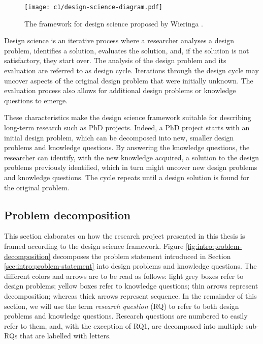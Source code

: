 \begin{figure}
    \centering
    \texttt{[image: c1/design-science-diagram.pdf]}
    \caption{The framework for design science proposed by Wieringa \cite{Wieringa2014}.}\label{fig:design-science}
\end{figure}

Design science is an iterative process where a researcher analyses a design problem, identifies a solution, evaluates the solution, and, if the solution is not satisfactory, they start over. 
The analysis of the design problem and its evaluation are referred to as design cycle.
Iterations through the design cycle may uncover aspects of the original design problem that were initially unknown.
The evaluation process also allows for additional design problems or knowledge questions to emerge.

These characteristics make the design science framework suitable for describing long-term research such as PhD projects.
Indeed, a PhD project starts with an initial design problem, which can be decomposed into new, smaller design problems and knowledge questions.
By answering the knowledge questions, the researcher can identify, with the new knowledge acquired, a solution to the design problems previously identified, which in turn might uncover new design problems and knowledge questions.
The cycle repeats until a design solution is found for the original problem.

\subsection{Problem decomposition}\label{c1:sec:problem-decomposition}
This section elaborates on how the research project presented in this thesis is framed according to the design science framework. 
Figure \ref{fig:intro:problem-decomposition} decomposes the problem statement introduced in Section \ref{sec:intro:problem-statement} into design problems and knowledge questions.
The different colors and arrows are to be read as follows: light grey boxes refer to design problems; yellow boxes refer to knowledge questions; thin arrows represent decomposition; whereas thick arrows represent sequence.
In the remainder of this section, we will use the term \emph{research question} (RQ) to refer to both design problems and knowledge questions.
Research questions are numbered to easily refer to them, and, with the exception of RQ1, are decomposed into multiple sub-RQs that are labelled with letters.

